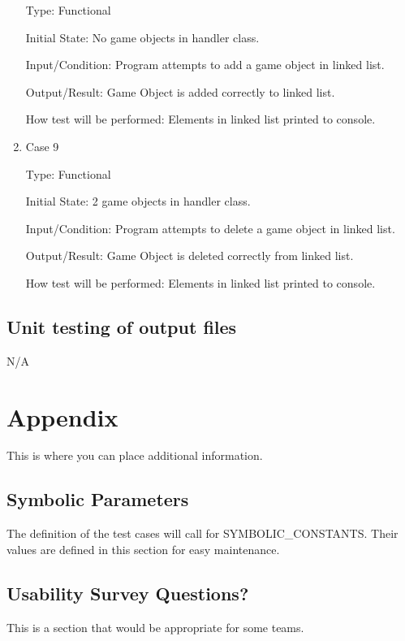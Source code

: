 \documentclass[12pt, titlepage]{article}
\begin{document}
\begin{enumerate}
Type: Functional

Initial State: No game objects in handler class.

Input/Condition: Program attempts to add a game object in linked list.

Output/Result: Game Object is added correctly to linked list.

How test will be performed: Elements in linked list printed to console.

\item{Case 9\\}

Type: Functional

Initial State: 2 game objects in handler class.

Input/Condition: Program attempts to delete a game object in linked list.

Output/Result: Game Object is deleted correctly from linked list.

How test will be performed: Elements in linked list printed to console.

\end{enumerate}
		
\subsection{Unit testing of output files}		

N/A





\newpage

\section{Appendix}

This is where you can place additional information.

\subsection{Symbolic Parameters}

The definition of the test cases will call for SYMBOLIC\_CONSTANTS.
Their values are defined in this section for easy maintenance.

\subsection{Usability Survey Questions?}

This is a section that would be appropriate for some teams.
\end{document}
